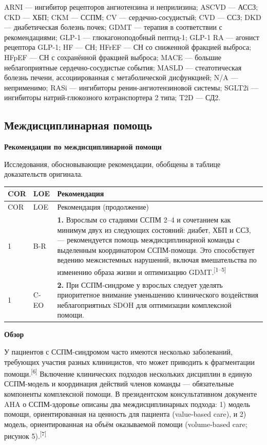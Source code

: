 \documentclass[11pt,a4paper]{article}
\newcommand{\src}[1]{\textsuperscript{[#1]}}
\newcommand{\heading}[1]{\par\medskip\textbf{#1}\par}
\begin{document}
ARNI --- ингибитор рецепторов ангиотензина и неприлизина; ASCVD --- АССЗ; CKD --- ХБП; CKM --- ССПМ; CV --- сердечно-сосудистый; CVD --- ССЗ; DKD --- диабетическая болезнь почек; GDMT --- терапия в соответствии с рекомендациями; GLP-1 --- глюкагоноподобный пептид-1; GLP-1 RA --- агонист рецептора GLP-1; HF --- СН; HFrEF --- СН со сниженной фракцией выброса; HFpEF --- СН с сохранённой фракцией выброса; MACE --- большие неблагоприятные сердечно-сосудистые события; MASLD --- стеатотическая болезнь печени, ассоциированная с метаболической дисфункцией; N/A --- неприменимо; RASi --- ингибиторы ренин-ангиотензиновой системы; SGLT2i --- ингибиторы натрий-глюкозного котранспортера 2 типа; T2D --- СД2.

\subsection{Междисциплинарная помощь}
\heading{Рекомендации по междисциплинарной помощи}
Исследования, обосновывающие рекомендации, обобщены в таблице доказательств оригинала.
{\small
\begin{longtable}{P{0.07\textwidth}P{0.11\textwidth}P{0.75\textwidth}}
\toprule COR & LOE & Рекомендация\\\midrule
\endfirsthead
\toprule COR & LOE & Рекомендация (продолжение)\\\midrule
{} & B-R & \textbf{1.} Взрослым со стадиями ССПМ 2--4 и сочетанием как минимум двух из следующих состояний: диабет, ХБП и ССЗ, --- рекомендуется помощь междисциплинарной команды с выделенным координатором ССПМ-помощи. Это способствует ведению межсистемных нарушений, включая вмешательства по изменению образа жизни и оптимизацию GDMT.\src{1--5}\\[5pt]
1 & C-EO & \textbf{2.} При ССПМ-синдроме у взрослых следует уделять приоритетное внимание уменьшению клинического воздействия неблагоприятных SDOH для оптимизации комплексной помощи.\\
\bottomrule
\end{longtable}
}

\heading{Обзор}
У пациентов с ССПМ-синдромом часто имеются несколько заболеваний, требующих участия разных клиницистов, что может приводить к фрагментации помощи.\src{6} Включение клинических подходов нескольких дисциплин в единую ССПМ-модель и координация действий членов команды --- обязательные компоненты комплексной помощи. В президентском консультативном документе AHA о ССПМ-здоровье описаны два междисциплинарных подхода: 1) модель помощи, ориентированная на ценность для пациента (value-based care), и 2) модель, ориентированная на объём оказываемой помощи (volume-based care; рисунок 5).\src{7}
\end{document}
